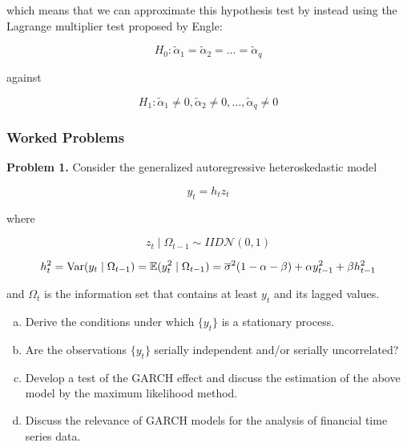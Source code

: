 which means that we can approximate this hypothesis test by instead using the Lagrange multiplier test proposed by Engle:

\[
H_0: \tilde{\alpha}_1 = \tilde{\alpha}_2 = \ldots = \tilde{\alpha}_q
\]

against

\[
H_1: \tilde{\alpha}_1 \neq 0, \tilde{\alpha}_2 \neq 0, \ldots, \tilde{\alpha}_q \neq 0
\]


\subsubsection{Worked Problems}


\textbf{Problem 1.} Consider the generalized autoregressive heteroskedastic model 

\[
y_t = h_t z_t
\]

where

\begin{equation}\label{ts.hw6.eq1.1}
z_t \mid \Omega_{t-1} \sim IID\mathcal{N}(0,1)
\end{equation}

\begin{equation}\label{ts.hw6.eq1.2}
h_t^2 = \Var(y_t \mid \Omega_{t-1}) = \E(y_t^2 \mid \Omega_{t-1}) = \overline{\sigma}^2(1 - \alpha - \beta) + \alpha y_{t-1}^2 + \beta h_{t-1}^2 
\end{equation}

and \(\Omega_t\) is the information set that contains at least \(y_t\) and its lagged values.

\begin{enumerate}[(a)]

\item Derive the conditions under which \(\{y_t\}\) is a stationary process.

\item Are the observations \(\{y_t\}\) serially independent and/or serially uncorrelated?

\item Develop a test of the GARCH effect and discuss the estimation of the above model by the maximum likelihood method.

\item Discuss the relevance of GARCH models for the analysis of financial time series data.

\end{enumerate}

